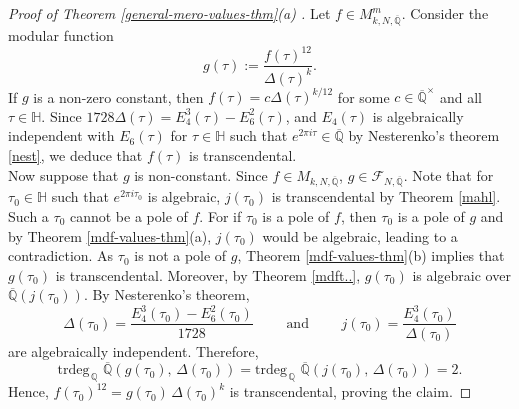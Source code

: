 \documentclass[11pt, reqno]{amsart}
\begin{document}
\begin{proof}[Proof of Theorem \ref{general-mero-values-thm}(a) ]
Let $f \in M^m_{k,N,\overline{\mathbb{Q}}}$. Consider the modular function 
\begin{equation*}
    g(\tau) := \frac{{f(\tau)}^{12}}{\Delta(\tau)^k}.
\end{equation*}
If $g$ is a non-zero constant, then $f(\tau) = c \Delta(\tau)^{k/12}$ for some $c \in \overline{\mathbb{Q}}^{\times}$ and all $\tau \in \mathbb{H}$. Since $1728 \Delta(\tau) = E_4^3(\tau) - E_6^2(\tau)$, and $E_4(\tau)$ is algebraically independent with $E_6(\tau)$ for $\tau \in \mathbb{H}$ such that $e^{2 \pi i \tau} \in \overline{\mathbb{Q}}$ by Nesterenko's theorem \ref{nest}, we deduce that $f(\tau)$ is transcendental. \\

Now suppose that $g$ is non-constant. Since $f \in M_{k,N,\overline{\mathbb{Q}}}$, $g \in \mathcal{F}_{N,\overline{\mathbb{Q}}}$. Note that for $\tau_0 \in \mathbb{H}$ such that $e^{2 \pi i \tau_0}$ is algebraic, $j(\tau_0)$ is transcendental by Theorem \ref{mahl}. Such a $\tau_0$ cannot be a pole of $f$. For if $\tau_0$ is a pole of $f$, then $\tau_0$ is a pole of $g$ and by Theorem \ref{mdf-values-thm}(a), $j(\tau_0)$ would be algebraic, leading to a contradiction. As $\tau_0$ is not a pole of $g$, Theorem \ref{mdf-values-thm}(b) implies that $g(\tau_0)$ is transcendental. Moreover, by Theorem \ref{mdft..}, $g(\tau_0)$ is algebraic over $\overline{\mathbb{Q}}(j(\tau_0))$. By Nesterenko's theorem, 
\begin{equation*}
    \Delta(\tau_0) = \frac{E_4^3(\tau_0) - E_6^2(\tau_0)}{1728} \qquad \text{ and } \qquad j(\tau_0) = \frac{E_4^3(\tau_0)}{\Delta(\tau_0)}
\end{equation*}
are algebraically independent. Therefore,
\begin{equation*}
    \text{trdeg}_{\,\mathbb{Q}} \, \, \overline{\mathbb{Q}} \left ( g(\tau_0), \, \Delta(\tau_0) \right) = \text{trdeg}_{\,\mathbb{Q}}\, \, \overline{\mathbb{Q}} \left ( j(\tau_0), \, \Delta(\tau_0) \right) = 2.
\end{equation*}
Hence, $f(\tau_0)^{12} = g(\tau_0) \, \Delta(\tau_0)^k$ is transcendental, proving the claim.
\end{proof}








\end{document}
